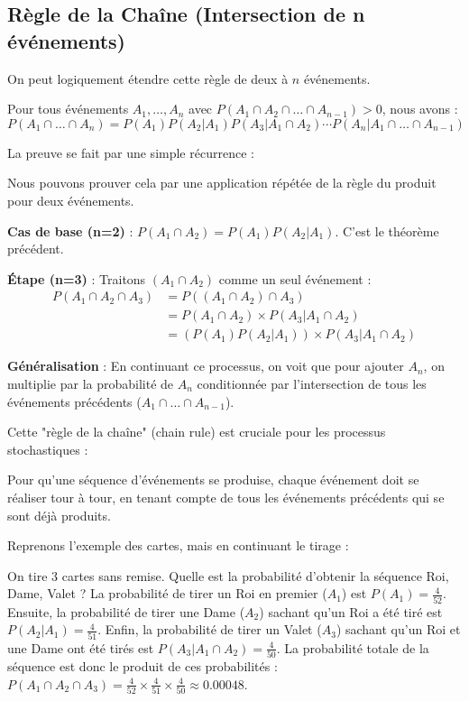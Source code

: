 \subsection{Règle de la Chaîne (Intersection de n événements)}

On peut logiquement étendre cette règle de deux à $n$ événements.

\begin{theorembox}
Pour tous événements $A_1, \dots, A_n$ avec $P(A_1 \cap A_2 \cap \dots \cap A_{n-1}) > 0$, nous avons :
$$P(A_1 \cap \dots \cap A_n) = P(A_1)P(A_2|A_1)P(A_3|A_1 \cap A_2) \cdots P(A_n|A_1 \cap \dots \cap A_{n-1})$$
\end{theorembox}

La preuve se fait par une simple récurrence :

\begin{proofbox}
Nous pouvons prouver cela par une application répétée de la règle du produit pour deux événements.

\textbf{Cas de base (n=2)} : $P(A_1 \cap A_2) = P(A_1)P(A_2|A_1)$. C'est le théorème précédent.

\textbf{Étape (n=3)} : Traitons $(A_1 \cap A_2)$ comme un seul événement :
\begin{align*}
P(A_1 \cap A_2 \cap A_3) &= P((A_1 \cap A_2) \cap A_3) \\
&= P(A_1 \cap A_2) \times P(A_3 | A_1 \cap A_2) \\
&= \left( P(A_1)P(A_2|A_1) \right) \times P(A_3 | A_1 \cap A_2)
\end{align*}

\textbf{Généralisation} : En continuant ce processus, on voit que pour ajouter $A_n$, on multiplie par la probabilité de $A_n$ conditionnée par l'intersection de tous les événements précédents ($A_1 \cap \dots \cap A_{n-1}$).
\end{proofbox}

Cette "règle de la chaîne" (chain rule) est cruciale pour les processus stochastiques :

\begin{intuitionbox}
Pour qu'une séquence d'événements se produise, chaque événement doit se réaliser tour à tour, en tenant compte de tous les événements précédents qui se sont déjà produits.
\end{intuitionbox}

Reprenons l'exemple des cartes, mais en continuant le tirage :

\begin{examplebox}
On tire 3 cartes sans remise. Quelle est la probabilité d'obtenir la séquence Roi, Dame, Valet ?
La probabilité de tirer un Roi en premier ($A_1$) est $P(A_1) = \frac{4}{52}$.
Ensuite, la probabilité de tirer une Dame ($A_2$) sachant qu'un Roi a été tiré est $P(A_2|A_1) = \frac{4}{51}$.
Enfin, la probabilité de tirer un Valet ($A_3$) sachant qu'un Roi et une Dame ont été tirés est $P(A_3|A_1 \cap A_2) = \frac{4}{50}$.
La probabilité totale de la séquence est donc le produit de ces probabilités : $P(A_1 \cap A_2 \cap A_3) = \frac{4}{52} \times \frac{4}{51} \times \frac{4}{50} \approx 0.00048$.
\end{examplebox}

